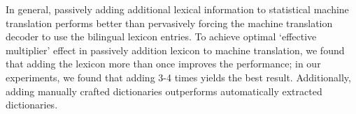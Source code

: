 In general, passively adding additional lexical information to statistical machine translation performs better than pervasively forcing the machine translation decoder to use the bilingual lexicon entries. To achieve optimal `effective multiplier' effect in passively addition lexicon to machine translation, we found that adding the lexicon more than once improves the performance; in our experiments, we found that adding 3-4 times yields the best result. Additionally, adding manually crafted dictionaries outperforms automatically extracted dictionaries. 



\iffalse
\section{Experiments on Workshop for Machine Translation (WMT) Dataset}
    \subsection{Using Named Entities and MWE for EN-HI Translations}
    \subsection{Using JRC Named Entities for EN-RU Translations}
\fi
    